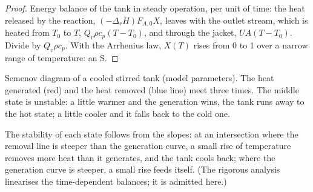 \begin{proof}
Energy balance of the tank in steady operation, per unit of time: the heat
released by the reaction, $(-\Delta_r H)F_{A,0}X$, leaves with the outlet
stream, which is heated from $T_0$ to $T$, $Q_v\rho c_p(T - T_0)$, and through
the jacket, $UA(T - T_0)$. Divide by $Q_v\rho c_p$. With the Arrhenius law,
$X(T)$ rises from 0 to 1 over a narrow range of temperature: an S.
\end{proof}

\begin{omfigure}

{\small Semenov diagram of a cooled stirred tank (model parameters). The
heat generated (red) and the heat removed (blue line) meet three times. The
middle state is unstable: a little warmer and the generation wins, the tank
runs away to the hot state; a little cooler and it falls back to the cold
one.}
\end{omfigure}

The stability of each state follows from the slopes: at an intersection
where the removal line is steeper than the generation curve, a small rise of
temperature removes more heat than it generates, and the tank cools back;
where the generation curve is steeper, a small rise feeds itself. (The
rigorous analysis linearises the time-dependent balances; it is admitted
here.)

